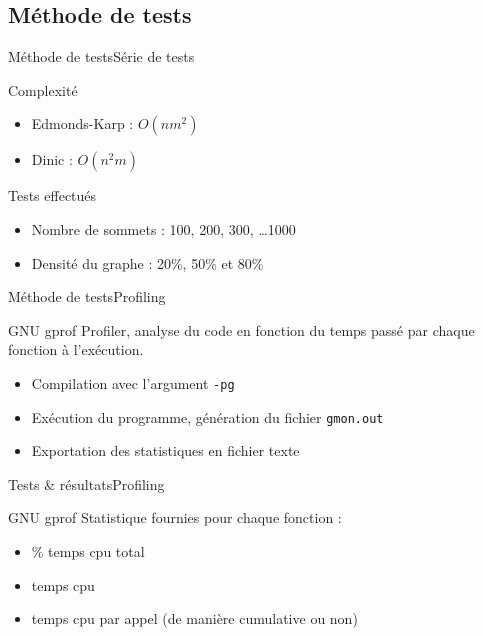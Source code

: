 \subsection{Méthode de tests}
\begin{frame}{Méthode de tests}{Série de tests}
\begin{block}{Complexité}
  \begin{itemize}
    \item Edmonds-Karp : $O(nm^2)$
    \item Dinic : $O(n^2m)$
  \end{itemize}
\end{block}
\begin{block}{Tests effectués}
  \begin{itemize}
    \item Nombre de sommets : 100, 200, 300, \ldots 1000
    \item Densité du graphe : 20\%, 50\% et 80\%
  \end{itemize}
\end{block}
\end{frame}

\begin{frame}{Méthode de tests}{Profiling}
\begin{block}{GNU gprof}
Profiler, analyse du code en fonction du temps passé par chaque fonction à l’exécution.
\begin{itemize}
\item Compilation avec l'argument \texttt{-pg}
\item Exécution du programme, génération du fichier \texttt{gmon.out}
\item Exportation des statistiques en fichier texte
\end{itemize}
\end{block}
\end{frame}

\begin{frame}{Tests \& résultats}{Profiling}
\begin{block}{GNU gprof}
Statistique fournies pour chaque fonction :
\begin{itemize}
\item \% temps cpu total
\item temps cpu
\item temps cpu par appel (de manière cumulative ou non)
\end{itemize}
\end{block}
\end{frame}

